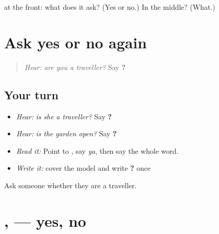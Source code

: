 \begin{tcolorbox}[breakable,colback=teal!4,colframe=teal!35!black,title={Before you move on}]
\textbf{} at the front: what does it ask? (Yes or no.) In the middle? (What.)
\end{tcolorbox}
\section[\texorpdfstring{\pa{ਕੀ} \pa{ਤੁਸੀਂ} \pa{ਯਾਤਰੀ} \pa{ਹੋ}? (kī tusīṁ yātrī ho?)}{ਕੀ ਤੁਸੀਂ ਯਾਤਰੀ ਹੋ? (kī tusīṁ yātrī ho?)}]{Ask yes or no again}

\label{lesson:PA-C214-polar-review}



\begin{quote}
\emph{Hear:} \emph{are you a traveller?} Say \textbf{   ?}
\end{quote}

\subsection*{Your turn}
\begin{itemize}
\raggedright
  \item \emph{Hear:} \emph{is she a traveller?} Say \textbf{   ?}
  \item \emph{Hear:} \emph{is the garden open?} Say \textbf{   ?}
  \item \emph{Read it:} \textbf{} Point to \textbf{}, say \emph{ya}, then say the whole word.
  \item \emph{Write it:} cover the model and write \textbf{   ?} once
\end{itemize}

\begin{tcolorbox}[breakable,colback=teal!4,colframe=teal!35!black,title={Before you move on}]
Ask someone whether they are a traveller.
\end{tcolorbox}
\section[\texorpdfstring{\pa{ਹਾਂ} \pa{ਜੀ} · \pa{ਨਹੀਂ} \pa{ਜੀ} (hāṁ jī · nahīṁ jī)}{ਹਾਂ ਜੀ · ਨਹੀਂ ਜੀ (hāṁ jī · nahīṁ jī)}]{ ,   — yes, no}

\label{lesson:PA-C214-answers}



